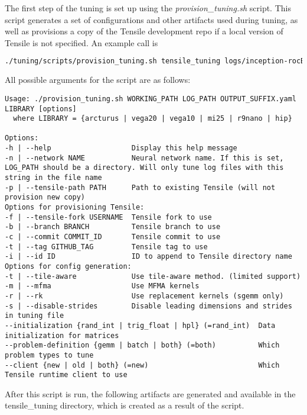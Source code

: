 \documentclass[]{article}
\begin{document}
The first step of the tuning is set up using the \emph{provision\_tuning.sh} script. This script generates a set of configurations and other artifacts used during tuning, as well as provisions a copy of the Tensile development repo if a local version of Tensile is not specified. An example call is


\begin{lstlisting}[language=bash,breaklines=true]
./tuning/scripts/provision_tuning.sh tensile_tuning logs/inception-rocBLAS-configs_unique.log tf_inception.yaml vega20
\end{lstlisting}

\noindent
All possible arguments for the script are as follows:

\begin{lstlisting}
Usage: ./provision_tuning.sh WORKING_PATH LOG_PATH OUTPUT_SUFFIX.yaml LIBRARY [options]
  where LIBRARY = {arcturus | vega20 | vega10 | mi25 | r9nano | hip}

Options:
-h | --help                   Display this help message
-n | --network NAME           Neural network name. If this is set, LOG_PATH should be a directory. Will only tune log files with this string in the file name
-p | --tensile-path PATH      Path to existing Tensile (will not provision new copy)
Options for provisioning Tensile:
-f | --tensile-fork USERNAME  Tensile fork to use
-b | --branch BRANCH          Tensile branch to use
-c | --commit COMMIT_ID       Tensile commit to use
-t | --tag GITHUB_TAG         Tensile tag to use
-i | --id ID                  ID to append to Tensile directory name
Options for config generation:
-t | --tile-aware             Use tile-aware method. (limited support)
-m | --mfma                   Use MFMA kernels
-r | --rk                     Use replacement kernels (sgemm only)
-s | --disable-strides        Disable leading dimensions and strides in tuning file
--initialization {rand_int | trig_float | hpl} (=rand_int)  Data initialization for matrices
--problem-definition {gemm | batch | both} (=both)          Which problem types to tune
--client {new | old | both} (=new)                          Which Tensile runtime client to use
\end{lstlisting}

After this script is run, the following artifacts are generated and available in the tensile\_tuning directory, which is created as a result of the script.
\end{document}
